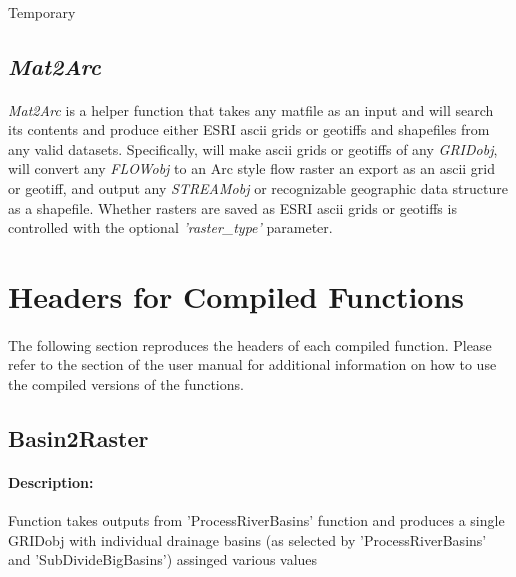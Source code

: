 \paragraph{}Temporary

\subsection{\textit{Mat2Arc}} \label{sec:Mat2Arc}
\paragraph{}\textit{Mat2Arc} is a helper function that takes any matfile as an input and will search its contents and produce either ESRI ascii grids or geotiffs and shapefiles from any valid datasets. Specifically, will make ascii grids or geotiffs of any \textit{GRIDobj}, will convert any \textit{FLOWobj} to an Arc style flow raster an export as an ascii grid or geotiff, and output any \textit{STREAMobj} or recognizable geographic data structure as a shapefile. Whether rasters are saved as ESRI ascii grids or geotiffs is controlled with the optional \textit{'raster\_type'} parameter.



\appendix

\section{Headers for Compiled Functions}\label{sec:CmpFuncCalls}
\paragraph{} The following section reproduces the headers of each compiled function. Please refer to the  section of the user manual for additional information on how to use the compiled versions of the functions.

\subsection{Basin2Raster}
\paragraph{Description:}
Function takes outputs from 'ProcessRiverBasins' function and produces a single GRIDobj with individual drainage
basins (as selected by 'ProcessRiverBasins' and 'SubDivideBigBasins') assinged various values

